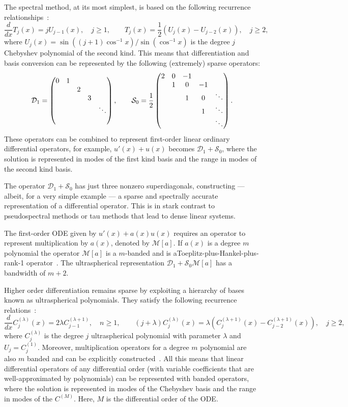 \documentclass[review]{siamart171218}
\begin{document}
The spectral method, at its most simplest, is based on the following recurrence relationships~\cite[(18.9.21) \& (18.9.9)]{NISTHandbook}: 
\[
 \frac{d}{dx} T_j(x) = jU_{j-1}(x), \quad j\geq 1, \qquad T_j(x) = \frac{1}{2}\left(U_{j}(x)-U_{j-2}(x)\right), \quad j\geq 2,
\]
where $U_{j}(x) = \sin((j+1)\cos^{-1}x)/\sin(\cos^{-1}x)$ is the degree $j$ Chebyshev polynomial of the second kind. This means that differentiation and basis conversion can be represented by the following (extremely) sparse operators:
\[
 \mathcal{D}_1 = \begin{pmatrix}0 & 1 \cr &&2\cr &&&3\cr &&&&\ddots\cr & \end{pmatrix}, \qquad \mathcal{S}_0 = \frac{1}{2}\begin{pmatrix}2 & 0 &-1\cr & 1 & 0 & -1 \cr && 1 & 0 & \ddots\cr &&& 1 &\ddots\cr &&&&\ddots  \end{pmatrix}.  
\]
These operators can be combined to represent first-order linear ordinary differential operators, for example, $u'(x) + u(x)$ becomes $\mathcal{D}_1 + \mathcal{S}_0$, where the solution is represented in modes of the first kind basis and the range in modes of the second kind basis. 

The operator $\mathcal{D}_1 + \mathcal{S}_0$ has just three nonzero superdiagonals, constructing --- albeit, for a very simple example --- a sparse and spectrally accurate representation of a differential operator.  This is in stark contrast to pseudospectral methods or tau methods that lead to dense linear systems.  

The first-order ODE given by $u'(x)+a(x)u(x)$ requires an operator to represent multiplication by $a(x)$, denoted by $\mathcal{M}[a]$. If $a(x)$ is a degree $m$ polynomial the operator $\mathcal{M}[a]$ is a $m$-banded and is aToeplitz-plus-Hankel-plus-rank-1 operator~\cite{Olver_13_01}. The ultraspherical representation $\mathcal{D}_1 + \mathcal{S}_0\mathcal{M}[a]$ has a bandwidth of $m+2$. 

Higher order differentiation remains sparse by exploiting a hierarchy of bases known as ultraspherical polynomials. They satisfy the following recurrence relations~\cite[(18.9.19),(18.9.7)]{NISTHandbook}:
\[
 \frac{d}{dx}C_j^{(\lambda)}(x) = 2\lambda C_{j-1}^{(\lambda+1)},\quad n\geq 1, \qquad (j+\lambda)C_j^{(\lambda)}(x) = \lambda\left(C_{j}^{(\lambda+1)}(x) -C_{j-2}^{(\lambda+1)}(x)\right), \quad j\geq 2,
\]
where $C^{(\lambda)}_j$ is the degree $j$ ultraspherical polynomial with parameter $\lambda$ and $U_j = C^{(1)}_j$. Moreover, multiplication operators for a degree $m$ polynomial are also $m$ banded and can be explicitly constructed~\cite{Olver_13_01}. All this means that linear differential operators of any differential order (with variable coefficients that are well-approximated by polynomials) can be represented with banded operators, where the solution is represented in modes of the Chebyshev basis and the range in modes of the $C^{(M)}$. Here, $M$ is the differential order of the ODE. 
\end{document}
